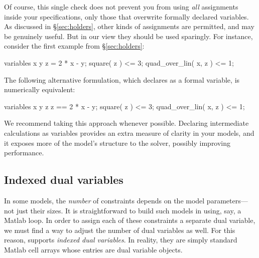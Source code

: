 \documentclass[12pt]{article}
\begin{document}
Of course, this single check does not prevent you from using \emph{all} assignments 
inside your \cvx specifications, only those that overwrite formally declared variables.
As discussed in \S\ref{sec:holders}, other kinds of assignments are permitted,
and may be genuinely useful. But in our view they should be used sparingly. For
instance, consider the first example from \S\ref{sec:holders}:
\begin{code}
	variables x y
	z = 2 * x - y;
	square( z ) <= 3;
	quad_over_lin( x, z ) <= 1;
\end{code}
The following alternative formulation, which declares \verb@z@
as a formal variable, is numerically equivalent:
\begin{code}
	variables x y z
	z == 2 * x - y;
	square( z ) <= 3;
	quad_over_lin( x, z ) <= 1;
\end{code}
We recommend taking this approach whenever possible. Declaring intermediate
calculations as variables provides an extra measure of clarity in your models,
and it exposes more of the model's structure to the solver,
possibly improving performance.

\subsection{Indexed dual variables}
\label{sec:indexeddual}

In some models, the \emph{number} of constraints depends on the model
parameters---not just their sizes. It is
straightforward to build such models in \cvx using, say, a
Matlab \verb@for@ loop. In order to assign each of these constraints
a separate dual variable, we must find a way to adjust the number of
dual variables as well. For this reason, \cvx supports
\emph{indexed dual variables}. In reality, they are simply standard
Matlab cell arrays whose entries are \cvx dual variable objects.
\end{document}
